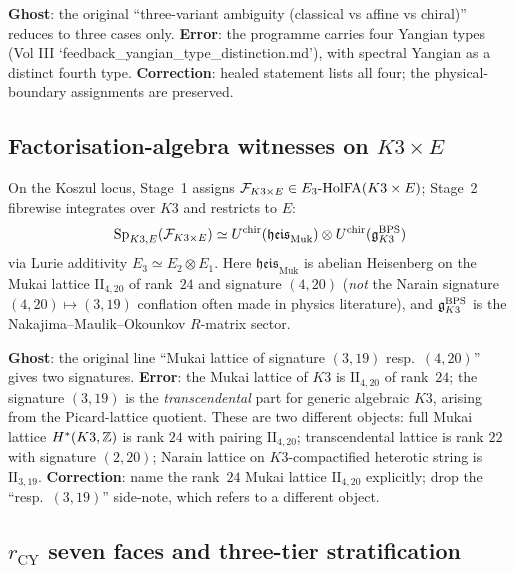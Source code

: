 \textbf{Ghost}: the original ``three-variant ambiguity (classical vs affine vs chiral)'' reduces to three cases only. \textbf{Error}: the programme carries four Yangian types (Vol III `feedback_yangian_type_distinction.md'), with spectral Yangian as a distinct fourth type. \textbf{Correction}: healed statement lists all four; the physical-boundary assignments are preserved.

\subsection{Factorisation-algebra witnesses on $K3 \times E$}
\label{wn:subsec:healed-K3E-witnesses}

\begin{theorem}\ClaimStatusHealed
\label{wn:thm:healed-Sp-K3E}
On the Koszul locus, Stage~1 assigns $\mathcal{F}_{K3 \times E} \in E_3\text{-}\mathrm{HolFA}(K3 \times E)$; Stage~2 fibrewise integrates over $K3$ and restricts to $E$:
\[
\mathrm{Sp}_{K3, E}(\mathcal{F}_{K3 \times E}) \simeq U^{\mathrm{chir}}(\mathfrak{heis}_{\mathrm{Muk}}) \otimes U^{\mathrm{chir}}(\mathfrak{g}^{\mathrm{BPS}}_{K3})
\]
via Lurie additivity $E_3 \simeq E_2 \otimes E_1$. Here $\mathfrak{heis}_{\mathrm{Muk}}$ is abelian Heisenberg on the Mukai lattice $\mathrm{II}_{4, 20}$ of rank~$24$ and signature $(4, 20)$ (\emph{not} the Narain signature $(4, 20) \mapsto (3, 19)$ conflation often made in physics literature), and $\mathfrak{g}^{\mathrm{BPS}}_{K3}$ is the Nakajima--Maulik--Okounkov $R$-matrix sector.
\end{theorem}

\textbf{Ghost}: the original line ``Mukai lattice of signature $(3, 19)$ resp.\ $(4, 20)$'' gives two signatures. \textbf{Error}: the Mukai lattice of $K3$ is $\mathrm{II}_{4, 20}$ of rank~$24$; the signature $(3, 19)$ is the \emph{transcendental} part for generic algebraic $K3$, arising from the Picard-lattice quotient. These are two different objects: full Mukai lattice $H^*(K3, \mathbb{Z})$ is rank $24$ with pairing $\mathrm{II}_{4, 20}$; transcendental lattice is rank $22$ with signature $(2, 20)$; Narain lattice on $K3$-compactified heterotic string is $\mathrm{II}_{3, 19}$. \textbf{Correction}: name the rank~$24$ Mukai lattice $\mathrm{II}_{4, 20}$ explicitly; drop the ``resp.\ $(3, 19)$'' side-note, which refers to a different object.

\subsection{$r_{\mathrm{CY}}$ seven faces and three-tier stratification}
\label{wn:subsec:healed-7-faces}

